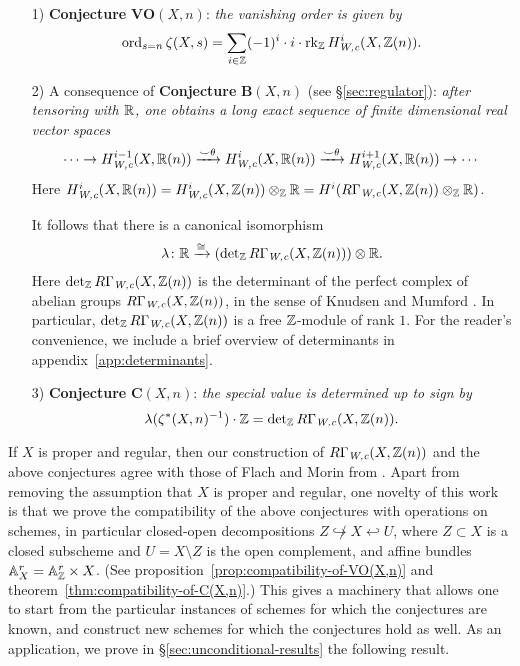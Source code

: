 \documentclass{article}
\numberwithin{equation}{section}
\begin{document}
\begin{enumerate}
\item[1)] \textbf{Conjecture} $\mathbf{VO} (X,n)$:
  \emph{the vanishing order is given by}
  \[ \operatorname{ord}_{s=n} \zeta (X,s) =
    \sum_{i\in \mathbb{Z}} (-1)^i \cdot i \cdot \operatorname{rk}_{\mathbb{Z}} H_{\text{\it W,c}}^i (X, \mathbb{Z}(n)). \]

\item[2)] A consequence of \textbf{Conjecture} $\mathbf{B} (X,n)$
  (see \S\ref{sec:regulator}):
  \emph{after tensoring with $\mathbb{R}$, one obtains a long exact sequence of finite
    dimensional real vector spaces}
  \[ \cdots \to H_{\text{\it W,c}}^{i-1} (X, \mathbb{R} (n)) \xrightarrow{\smile\theta}
    H_{\text{\it W,c}}^i (X, \mathbb{R} (n)) \xrightarrow{\smile\theta}
    H_{\text{\it W,c}}^{i+1} (X, \mathbb{R} (n)) \to \cdots \]
  Here
  $H_{\text{\it W,c}}^i (X, \mathbb{R} (n)) = H_{\text{\it W,c}}^i (X, \mathbb{Z} (n)) \otimes_{\mathbb{Z}} \mathbb{R} =
  H^i (R\Gamma_{\text{\it W,c}} (X, \mathbb{Z} (n)) \otimes_{\mathbb{Z}} \mathbb{R})$.

  It follows that there is a canonical isomorphism
  \[ \lambda\colon \mathbb{R} \xrightarrow{\cong}
    (\operatorname{det}_{\mathbb{Z}} R\Gamma_{\text{\it W,c}} (X, \mathbb{Z} (n))) \otimes \mathbb{R}. \]
  Here $\operatorname{det}_{\mathbb{Z}} R\Gamma_{\text{\it W,c}} (X, \mathbb{Z} (n))$ is the determinant of the
  perfect complex of abelian groups $R\Gamma_{\text{\it W,c}} (X, \mathbb{Z} (n))$, in the sense of
  Knudsen and Mumford \cite{Knudsen-Mumford-1976}. In particular,
  $\operatorname{det}_{\mathbb{Z}} R\Gamma_{\text{\it W,c}} (X, \mathbb{Z} (n))$ is a free $\mathbb{Z}$-module of rank
  $1$. For the reader's convenience, we include a brief overview of determinants
  in appendix~\ref{app:determinants}.

\item[3)] \textbf{Conjecture} $\mathbf{C} (X,n)$:
  \emph{the special value is determined up to sign by}
  \[ \lambda (\zeta^* (X, n)^{-1}) \cdot \mathbb{Z} =
    \operatorname{det}_{\mathbb{Z}} R\Gamma_{\text{\it W,c}} (X, \mathbb{Z} (n)). \]
\end{enumerate}

If $X$ is proper and regular, then our construction of
$R\Gamma_{\text{\it W,c}} (X, \mathbb{Z} (n))$ and the above conjectures agree with those of Flach
and Morin from \cite{Flach-Morin-2018}. Apart from removing the assumption that
$X$ is proper and regular, one novelty of this work is that we prove the
compatibility of the above conjectures with operations on schemes, in particular
closed-open decompositions $Z \not\hookrightarrow X \hookleftarrow U$, where
$Z \subset X$ is a closed subscheme and $U = X\setminus Z$ is the open
complement, and affine bundles $\mathbb{A}_X^r = \mathbb{A}_{\mathbb{Z}}^r \times X$.
(See proposition~\ref{prop:compatibility-of-VO(X,n)} and
theorem~\ref{thm:compatibility-of-C(X,n)}.) This gives a machinery that allows
one to start from the particular instances of schemes for which the conjectures
are known, and construct new schemes for which the conjectures hold as well.  As
an application, we prove in \S\ref{sec:unconditional-results} the following
result.
\end{document}
